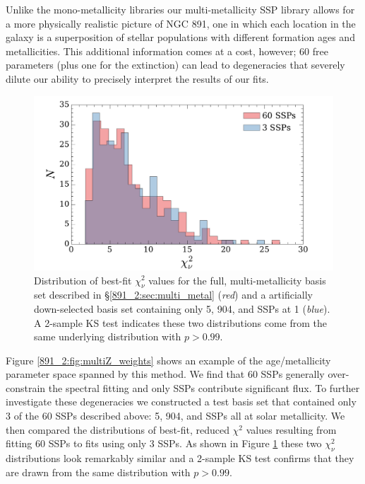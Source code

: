 Unlike the mono-metallicity libraries our multi-metallicity SSP
library allows for a more physically realistic picture of NGC 891, one
in which each location in the galaxy is a superposition of stellar
populations with different formation ages and metallicities. This
additional information comes at a cost, however; 60 free parameters
(plus one for the extinction) can lead to degeneracies that severely
dilute our ability to precisely interpret the results of our fits.

\begin{figure}
  \centering
  \includegraphics[width=\columnwidth]{891_2/figs/allz_chihist.pdf}
  \caption[$\chi_{\nu}^2$ distributions for template libraries with 60
  and 3 SSPs]{\fixspacing\label{891_2:fig:3SSP_chi}Distribution of
    best-fit $\chi^2_\nu$ values for the full, multi-metallicity basis
    set described in \S\ref{891_2:sec:multi_metal} (\emph{red}) and a
    artificially down-selected basis set containing only 5, 904, and
     SSPs at 1 \Zsol (\emph{blue}). A 2-sample KS test
    indicates these two distributions come from the same underlying
    distribution with $p > 0.99$.}
\end{figure}

Figure \ref{891_2:fig:multiZ_weights} shows an example of the
age/metallicity parameter space spanned by this method. We find that
60 SSPs generally over-constrain the spectral fitting and only 
SSPs contribute significant flux. To further investigate these
degeneracies we constructed a test basis set that contained only 3 of
the 60 SSPs described above: 5, 904, and  SSPs all at
solar metallicity. We then compared the distributions of best-fit,
reduced $\chi^2$ values resulting from fitting 60 SSPs to fits using
only 3 SSPs. As shown in Figure \ref{891_2:fig:3SSP_chi} these two
$\chi^2_\nu$ distributions look remarkably similar and a 2-sample KS
test confirms that they are drawn from the same distribution with $p >
0.99$. 

